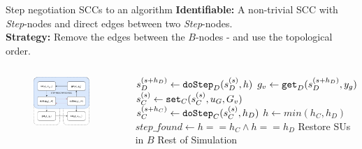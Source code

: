 \documentclass{beamer}
\begin{document}
\begin{frame}{Step negotiation SCCs to an algorithm}
    \textbf{Identifiable:} A non-trivial SCC with \textit{Step}-nodes and direct edges between two \textit{Step}-nodes.\\
    \textbf{Strategy:} Remove the edges between the $B$-nodes - and use the topological order.
    \begin{columns}[T] %
        \begin{column}{.48\textwidth}
            \begin{figure}    
                \includegraphics[width=0.95\textwidth]{images/step_scenario_graph.pdf}
            \end{figure}
    \end{column}%
    \hfill%
    \begin{column}{.48\textwidth}
        \begin{algorithm}[H]
        \caption{Step negotiation.}
        \begin{algorithmic}[1]
            \scriptsize
            \State $s_{D}^{(s+h_D)} \gets \mathtt{doStep}_{D}(s_{D}^{(s)}, h)$
            \State $g_v \gets \mathtt{get}_{D}(s_{D}^{(s+h_D)}, y_{g})$       
            \State $s_{C}^{(s)} \gets \mathtt{set}_{C}(s_{C}^{(s)}, u_{G}, G_v)$
            \State $s_{C}^{(s+h_C)} \gets \mathtt{doStep}_{C}(s_{C}^{(s)}, h_D)$
            \State $h \gets min(h_C, h_D)$
            \State $step\_found \gets h == h_C \land h == h_D$
                \State Restore SUs in $B$
            \EndIf
            \EndWhile
            \State Rest of Simulation
        \end{algorithmic}
        \end{algorithm}
    \end{column}%
    \end{columns}
\end{frame}
\end{document}
